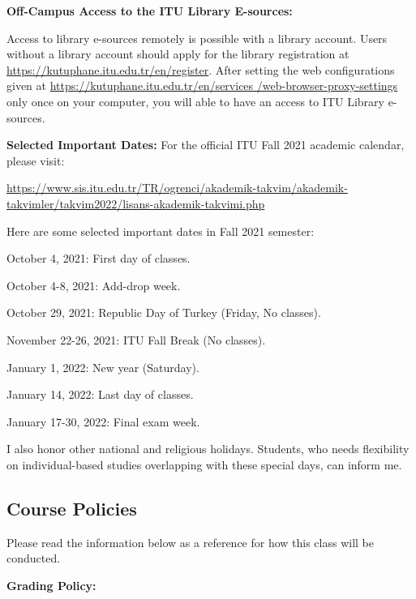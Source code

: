 \documentclass[
  12pt,
]{article}
\begin{document}
\textbf{Off-Campus Access to the ITU Library E-sources:}

Access to library e-sources remotely is possible with a library account.
Users without a library account should apply for the library
registration at
\href{Library register}{https://kutuphane.itu.edu.tr/en/register}. After
setting the web configurations given at
\href{Proxy}{https://kutuphane.itu.edu.tr/en/services \linebreak /web-browser-proxy-settings}
only once on your computer, you will able to have an access to ITU
Library e-sources.

\textbf{Selected Important Dates:} For the official ITU Fall 2021
academic calendar, please visit:

\url{https://www.sis.itu.edu.tr/TR/ogrenci/akademik-takvim/akademik-takvimler/takvim2022/lisans-akademik-takvimi.php}

Here are some selected important dates in Fall 2021 semester:

October 4, 2021: First day of classes.

October 4-8, 2021: Add-drop week.

October 29, 2021: Republic Day of Turkey (Friday, No classes).

November 22-26, 2021: ITU Fall Break (No classes).

January 1, 2022: New year (Saturday).

January 14, 2022: Last day of classes.

January 17-30, 2022: Final exam week.

I also honor other national and religious holidays. Students, who needs
flexibility on individual-based studies overlapping with these special
days, can inform me.

\hypertarget{course-policies}{%
\subsection{Course Policies}\label{course-policies}}

Please read the information below as a reference for how this class will
be conducted.

\textbf{Grading Policy:}
\end{document}
